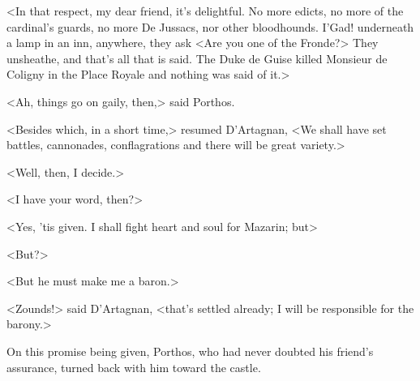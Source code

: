 <In that respect, my dear friend, it's delightful. No more edicts, no more of the cardinal's guards, no more De Jussacs, nor other bloodhounds. I'Gad! underneath a lamp in an inn, anywhere, they ask <Are you one of the Fronde?> They unsheathe, and that's all that is said. The Duke de Guise killed Monsieur de Coligny in the Place Royale and nothing was said of it.>

<Ah, things go on gaily, then,> said Porthos.

<Besides which, in a short time,> resumed D'Artagnan, <We shall have set battles, cannonades, conflagrations and there will be great variety.>

<Well, then, I decide.>

<I have your word, then?>

<Yes, 'tis given. I shall fight heart and soul for Mazarin; but\longdash>

<But?>

<But he must make me a baron.>

<Zounds!> said D'Artagnan, <that's settled already; I will be responsible for the barony.>

On this promise being given, Porthos, who had never doubted his friend's assurance, turned back with him toward the castle. 